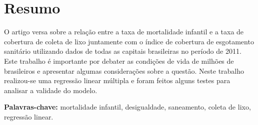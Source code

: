 \chapter{Resumo}
\label{cap:resumo}
O artigo versa sobre a relação entre a taxa de mortalidade infantil e a taxa de cobertura de coleta de lixo juntamente com o índice de cobertura de esgotamento sanitário utilizando
dados de todas as capitais brasileiras no período de 2011. Este trabalho é importante por debater as condições de vida de milhões de brasileiros e apresentar algumas considerações sobre a
questão. Neste trabalho realizou-se uma regressão linear múltipla e foram feitos alguns testes para analisar a validade do modelo.

\textbf{Palavras-chave:} mortalidade infantil, desigualdade, saneamento, coleta de lixo, regressão linear.
